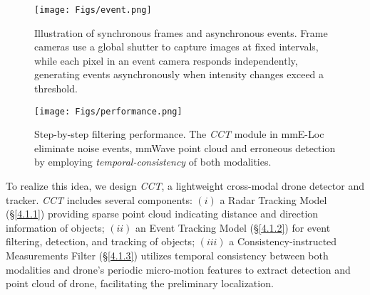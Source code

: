 \begin{figure}[t]
    \setlength{\abovecaptionskip}{0.2cm} %
    \setlength{\belowcaptionskip}{-0.3cm}
    \setlength{\subfigcapskip}{-0.4cm}
    \centering
        \texttt{[image: Figs/event.png]}
    \caption{Illustration of synchronous frames and asynchronous events. \textnormal{Frame cameras use a global shutter to capture images at fixed intervals, while each pixel in an event camera responds independently, generating events asynchronously when intensity changes exceed a threshold.}}
    \label{event}
    \vspace{-0.4cm}
\end{figure} 

\begin{figure*}[t]
    \setlength{\abovecaptionskip}{0.4cm} %
    \setlength{\belowcaptionskip}{-0.34cm}
    \setlength{\subfigcapskip}{-0.25cm}
    \centering
        \texttt{[image: Figs/performance.png]}
        \vspace{-0.28cm}
    \caption{Step-by-step filtering performance. \textnormal{The \textit{CCT} module in mmE-Loc eliminate noise events, mmWave point cloud and erroneous detection by employing \textit{temporal-consistency} of both modalities.}}
    \label{performance}
    \vspace{-0.2cm}
\end{figure*}

To realize this idea, we design \textit{CCT}, a lightweight cross-modal drone detector and tracker.
\textit{CCT} includes several components:
$(i)$ a Radar Tracking Model (§\ref{4.1.1}) providing sparse point cloud indicating distance and direction information of objects;
$(ii)$ an Event Tracking Model (§\ref{4.1.2}) for event filtering, detection, and tracking of objects;
$(iii)$ a Consistency-instructed Measurements Filter (§\ref{4.1.3}) utilizes temporal consistency between both modalities and drone's periodic micro-motion features to extract detection and point cloud of drone, facilitating the preliminary localization.


